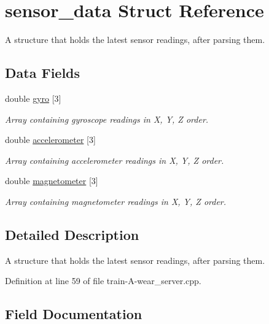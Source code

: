 \hypertarget{structsensor__data}{}\section{sensor\+\_\+data Struct Reference}
\label{structsensor__data}


A structure that holds the latest sensor readings, after parsing them.  


\subsection*{Data Fields}
\begin{DoxyCompactItemize}
\item 
double \mbox{\hyperlink{structsensor__data_a876645af25bff9b0d84d7e2b887e9e26}{gyro}} \mbox{[}3\mbox{]}
\begin{DoxyCompactList}\small\item\em Array containing gyroscope readings in X, Y, Z order. \end{DoxyCompactList}\item 
double \mbox{\hyperlink{structsensor__data_abe04dafd6224d1d362a165ec851a67d2}{accelerometer}} \mbox{[}3\mbox{]}
\begin{DoxyCompactList}\small\item\em Array containing accelerometer readings in X, Y, Z order. \end{DoxyCompactList}\item 
double \mbox{\hyperlink{structsensor__data_a1c61b803f50641039d93ff47f48cead2}{magnetometer}} \mbox{[}3\mbox{]}
\begin{DoxyCompactList}\small\item\em Array containing magnetometer readings in X, Y, Z order. \end{DoxyCompactList}\end{DoxyCompactItemize}


\subsection{Detailed Description}
A structure that holds the latest sensor readings, after parsing them. 

Definition at line 59 of file train-\/\+A-\/wear\+\_\+server.\+cpp.



\subsection{Field Documentation}
\mbox{\label{structsensor__data_abe04dafd6224d1d362a165ec851a67d2}} 
